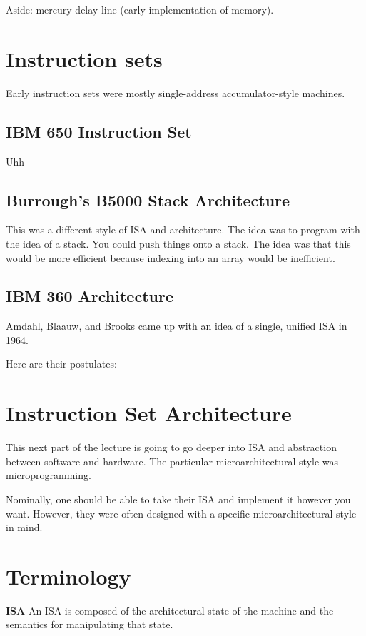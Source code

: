 Aside: mercury delay line (early implementation of memory).


\section{Instruction sets}

Early instruction sets were mostly single-address accumulator-style machines.


\subsection{IBM 650 Instruction Set}
Uhh

\subsection{Burrough's B5000 Stack Architecture}
This was a different style of ISA and architecture.
The idea was to program with the idea of a stack.
You could push things onto a stack.
The idea was that this would be more efficient because indexing into an array would be inefficient.


\subsection{IBM 360 Architecture}
Amdahl, Blaauw, and Brooks came up with an idea of a single, unified ISA in 1964.

Here are their postulates:

\section{Instruction Set Architecture}
This next part of the lecture is going to go deeper into ISA and abstraction between software and hardware.
The particular microarchitectural style was microprogramming.


Nominally, one should be able to take their ISA and implement it however you want.
However, they were often designed with a specific microarchitectural style in mind.

\section{Terminology}

\textbf{ISA} An ISA is composed of the architectural state of the machine and the semantics for manipulating that state.

